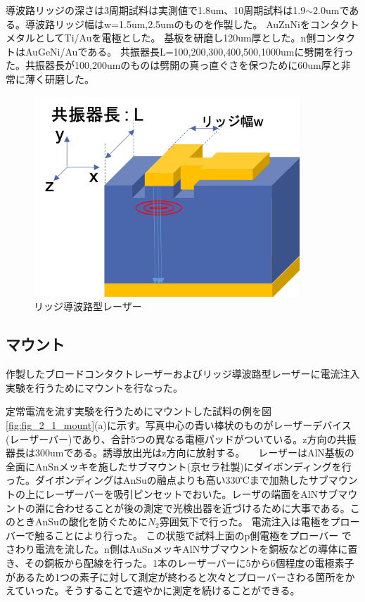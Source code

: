 導波路リッジの深さは3周期試料は実測値で1.8um、10周期試料は1.9$\sim$2.0umである。導波路リッジ幅はw=1.5um,2.5umのものを作製した。
AuZnNiをコンタクトメタルとしてTi/Auを電極とした。
基板を研磨し120um厚とした。n側コンタクトはAuGeNi/Auである。
共振器長L=100,200,300,400,500,1000umに劈開を行った。共振器長が100,200umのものは劈開の真っ直ぐさを保つために60um厚と非常に薄く研磨した。
\begin{figure}[t]
	\centering
	\includegraphics[width=10cm]{figure/fig_2_1_ridge.png}
	\caption{リッジ導波路型レーザー}
	\label{fig_2_1_ridge}
\end{figure}
\clearpage
\subsection{マウント}%
作製したブロードコンタクトレーザーおよびリッジ導波路型レーザーに電流注入実験を行うためにマウントを行なった。

定常電流を流す実験を行うためにマウントした試料の例を図\ref{fig:fig_2_1_mount}(a)に示す。写真中心の青い棒状のものがレーザーデバイス(レーザーバー)であり、合計5つの異なる電極パッドがついている。z方向の共振器長は300umである。誘導放出光はz方向に放射する。
　レーザーはAlN基板の全面にAnSnメッキを施したサブマウント(京セラ社製)にダイボンディングを行った。ダイボンディングはAnSuの融点よりも高い330℃まで加熱したサブマウントの上にレーザーバーを吸引ピンセットでおいた。レーザの端面をAlNサブマウントの淵に合わせることが後の測定で光検出器を近づけるために大事である。このときAnSuの酸化を防ぐために$N_{2}$雰囲気下で行った。
電流注入は電極をプローバーで触ることにより行った。
この状態で試料上面のp側電極をプローバー
でさわり電流を流した。n側はAuSnメッキAlNサブマウントを銅板などの導体に置き、その銅板から配線を行った。1本のレーザーバーに5から6個程度の電極素子があるため1つの素子に対して測定が終わると次々とプローバーさわる箇所をかえていった。そうすることで速やかに測定を続けることができる。


